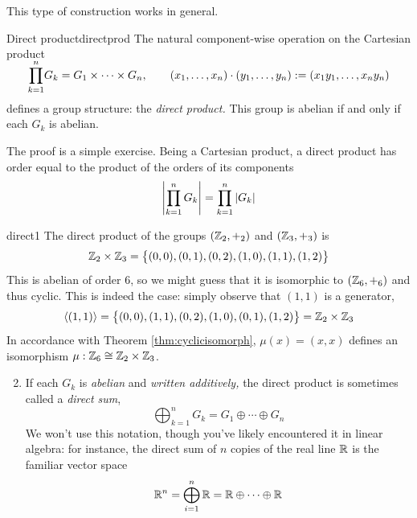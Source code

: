 This type of construction works in general.

\begin{thm}{Direct product}{directprod}
	The natural component-wise operation on the Cartesian product
	\[
		\smash[t]{\prod\limits_{k=1}^n} G_k=G_1\times\cdots\times G_n,\qquad (x_1,\ldots,x_n)\cdot(y_1,\ldots,y_n):=(x_1y_1,\ldots,x_ny_n)
	\]
	defines a group structure: the \emph{direct product.} This group is abelian if and only if each $G_k$ is abelian.
\end{thm}

The proof is a simple exercise. Being a Cartesian product, a direct product has order equal to the product of the orders of its components
\[
	\left| \prod\limits_{k=1}^n G_k\right|=\prod\limits_{k=1}^n\left| G_k\right|
\]
\vspace{2pt}


\begin{examples}{}{direct1}
	\exstart The direct product of the groups $(\mathbb{Z}_2,+_2)$ and $(\mathbb{Z}_3,+_3)$ is
	\[
		\mathbb{Z}_2\times\mathbb{Z}_3=\bigl\{(0,0),(0,1),(0,2),(1,0),(1,1),(1,2)\bigr\}
	\]
	This is abelian of order 6, so we might guess that it is isomorphic to $(\mathbb{Z}_6,+_6)$ and thus cyclic. This is indeed the case: simply observe that $(1,1)$ is a generator,
	\[
		\left\langle (1,1)\right\rangle=\bigl\{(0,0),(1,1),(0,2),(1,0),(0,1),(1,2)\bigr\}=\mathbb{Z}_2\times\mathbb{Z}_3
	\]
	In accordance with Theorem \ref{thm:cyclicisomorph}, $\mu(x)=(x,x)$ defines an isomorphism $\mu:\mathbb{Z}_6\cong\mathbb{Z}_2\times \mathbb{Z}_3$.

	\goodbreak

	\begin{enumerate}\setcounter{enumi}{1}
		\item If each $G_k$ is \emph{abelian} and \emph{written additively,} the direct product is sometimes called a \emph{direct sum},\footnotemark{}
		\[
			\bigoplus_{k=1}^nG_k=G_1\oplus\cdots\oplus G_n
		\]
		We won't use this notation, though you've likely encountered it in linear algebra: for instance, the direct sum of $n$ copies of the real line $\mathbb{R}$ is the familiar vector space
		\[
			\mathbb{R}^n=\bigoplus_{i=1}^n\mathbb{R}=\mathbb{R}\oplus\cdots\oplus\mathbb{R}
		\]
	\end{enumerate}
\end{examples}


\vspace{-5pt}


